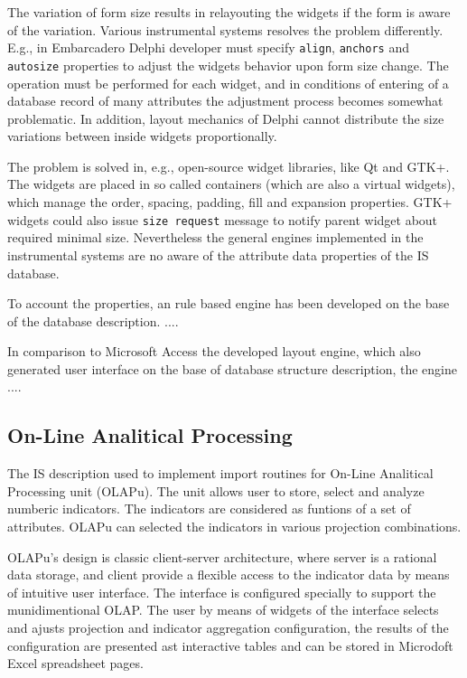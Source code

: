 \documentclass[conference]{IEEEtran}
\begin{document}
The variation of form size results in relayouting the widgets if the form is aware of the variation.  Various instrumental systems resolves the problem differently.  E.g., in Embarcadero Delphi developer must specify \texttt{align}, \texttt{anchors} and \texttt{autosize} properties to adjust the widgets behavior upon form size change.  The operation must be performed for each widget, and in conditions of entering of a database record of many attributes the adjustment process becomes somewhat problematic.  In addition, layout mechanics of Delphi cannot distribute the size variations between inside widgets proportionally.

The problem is solved in, e.g., open-source widget libraries, like Qt and GTK+.  The widgets are placed in so called containers (which are also a virtual widgets), which manage the order, spacing, padding, fill and expansion properties.  GTK+ widgets could also issue \texttt{size request} message to notify parent widget about required minimal size.  Nevertheless the general engines implemented in the instrumental systems are no aware of the attribute data properties of the IS database.

To account the properties, an rule based engine has been developed on the base of the database description.  ....


In comparison to Microsoft Access the developed layout engine, which also generated user interface on the base of database structure description, the engine ....

\subsection{On-Line Analitical Processing}
\label{sec:olap}

The IS description used to implement import routines for On-Line Analitical Processing unit (OLAPu).  The unit allows user to store, select and analyze numberic indicators.  The indicators are considered as funtions of a set of attributes.  OLAPu can 
selected the indicators in various projection combinations.  

OLAPu's design is classic client-server architecture, where server is a rational data storage, and client provide a flexible access to the indicator data by means of intuitive user interface.  The interface is configured specially to support the munidimentional OLAP.  The user by means of widgets of the interface selects and ajusts projection and indicator aggregation configuration, the results of the configuration are presented ast interactive tables and can be stored in Microdoft Excel spreadsheet pages.
\end{document}
